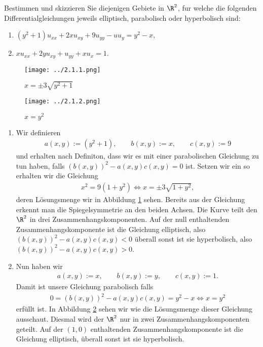 \begin{exercise}

Bestimmen und skizzieren Sie diejenigen Gebiete in $\R^2$, fur welche die folgenden Differentialgleichungen jeweils elliptisch, parabolisch oder hyperbolisch sind:

\begin{enumerate}[label = (\roman*)]
    \item $(y^2 + 1) u_{xx} + 2 x u_{xy} + 9 u_{yy} - u u_y = y^2 - x$,
    \item $x u_{xx} + 2 y u_{xy} + u_{yy} + x u_x = 1$.
\end{enumerate}

\end{exercise}

\begin{solution}
	\begin{figure}[h!]
		\centering
		\texttt{[image: ../2.1.1.png]}
		\caption{$x = \pm 3 \sqrt{y^2 + 1}$}
		\label{fig:(i)}
	\end{figure}
	\begin{figure}[h!]
		\centering
		\texttt{[image: ../2.1.2.png]}
		\caption{$x = y^2$}
		\label{fig:(ii)}
	\end{figure}
	\begin{enumerate}[label = (\roman*)]
		\item Wir definieren 
		\begin{align*}
			a(x,y) := (y^2 + 1), \qquad b(x,y) := x, \qquad c(x,y) := 9 
		\end{align*}
		und erhalten nach Definiton, dass wir es mit einer parabolischen Gleichung zu tun haben, falls $\left(b(x,y)\right)^2 - a(x,y)c(x,y) = 0$ ist. Setzen wir ein so erhalten wir die Gleichung
		\begin{align*}
		x^2 = 9(1 + y^2) \Leftrightarrow x = \pm 3\sqrt{1 + y^2},
		\end{align*}
		deren Lösungsmenge wir in Abbildung \ref{fig:(i)} sehen. Bereits aus der Gleichung erkennt man die Spiegelsymmetrie an den beiden Achsen. Die Kurve teilt den $\R^2$ in drei Zusammenhangskomponenten. Auf der null enthaltenden Zusammenhangskomponente ist die Gleichung elliptisch, also $\left(b(x,y)\right)^2 - a(x,y)c(x,y) < 0$ überall sonst ist sie hyperbolisch, also $\left(b(x,y)\right)^2 - a(x,y)c(x,y) > 0$.
		
		\item Nun haben wir
		\begin{align*}
		a(x,y) := x, \qquad b(x,y) := y, \qquad c(x,y) := 1 .
		\end{align*}
		Damit ist unsere Gleichung parabolisch falls
		\begin{align*}
		0 = \left(b(x,y)\right)^2 - a(x,y)c(x,y) = y^2 - x \Leftrightarrow x = y^2
		\end{align*}
		erfüllt ist. In Abbildung \ref{fig:(ii)} sehen wir wie die Lösungsmenge dieser Gleichung ausschaut. Diesmal wird der $\R^2$ nur in zwei Zusammenhangskomponenten geteilt. Auf der $(1,0)$ enthaltenden Zusammenhangskomponente ist die Gleichung elliptisch, überall sonst ist sie hyperbolisch.
	\end{enumerate}
\end{solution}

